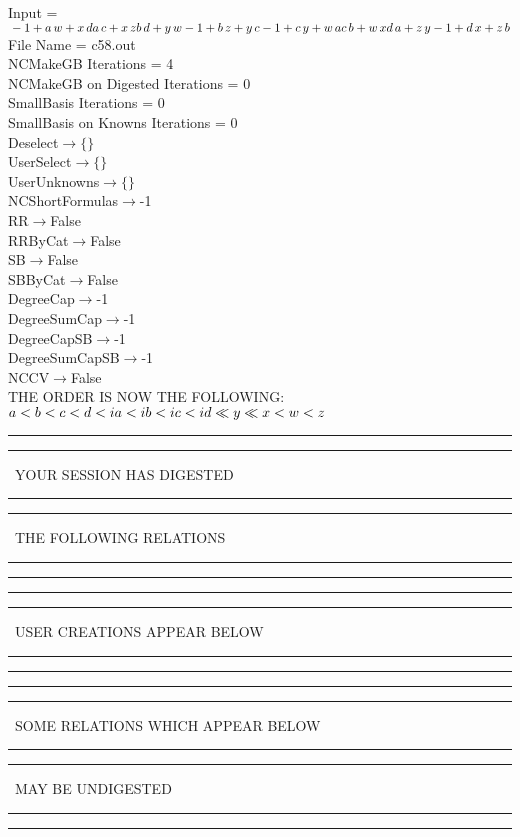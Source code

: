 \documentclass[rep10,leqno]{report}
\begin{document}
\normalsize
\baselineskip=12pt
\noindent
Input = 
$
\\-1 + a\,
 w + x\,
 d\\
a\,
 c + x\,
 z\\
b\,
 d + y\,
 w\\
-1 + b\,
 z + y\,
 c\\
-1 + c\,
 y + w\,
 a\\
c\,
 b + w\,
 x\\
d\,
 a + z\,
 y\\
-1 + d\,
 x + z\,
 b\\
$
File Name = c58.out\\
NCMakeGB Iterations = 4\\
NCMakeGB on Digested Iterations = 0\\
SmallBasis Iterations = 0\\
SmallBasis on Knowns Iterations = 0\\
Deselect$\rightarrow \{\}$\\
UserSelect$\rightarrow \{\}$\\
UserUnknowns$\rightarrow \{\}$\\
NCShortFormulas$\rightarrow$-1\\
RR$\rightarrow $False\\
RRByCat$\rightarrow $False\\
SB$\rightarrow $False\\
SBByCat$\rightarrow $False\\
DegreeCap$\rightarrow $-1\\
DegreeSumCap$\rightarrow $-1\\
DegreeCapSB$\rightarrow $-1\\
DegreeSumCapSB$\rightarrow $-1\\
NCCV$\rightarrow $False\\
THE ORDER IS NOW THE FOLLOWING:\hfil\break
$
a<b<c<d<ia<ib<ic<id\ll
y\ll
x<w<z\\
$
\rule[2pt]{6in}{4pt}\hfil\break
\rule[2pt]{1.879in}{4pt}
\ YOUR SESSION HAS DIGESTED\ 
\rule[2pt]{1.879in}{4pt}\hfil\break
\rule[2pt]{1.923in}{4pt}
\ THE FOLLOWING RELATIONS\ 
\rule[2pt]{1.923in}{4pt}\hfil\break
\rule[2pt]{6in}{4pt}\hfil\break
\rule[2pt]{6in}{1pt}\hfil\break
\rule[2.5pt]{1.701in}{1pt}
\ USER CREATIONS APPEAR BELOW\ 
\rule[2.5pt]{1.701in}{1pt}\hfil\break
\rule[2pt]{6in}{1pt}\hfil\break
\rule[2pt]{6in}{4pt}\hfil\break
\rule[2pt]{1.45in}{4pt}
\ SOME RELATIONS WHICH APPEAR BELOW\ 
\rule[2pt]{1.45in}{4pt}\hfil\break
\rule[2pt]{2.18in}{4pt}
\ MAY BE UNDIGESTED\ 
\rule[2pt]{2.18in}{4pt}\hfil\break
\rule[2pt]{6in}{4pt}\hfil\break
\end{document}
